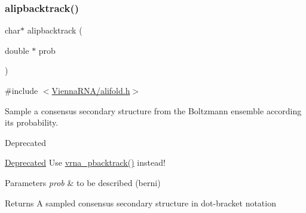 \subsubsection{\texorpdfstring{alipbacktrack()}{alipbacktrack()}}
{\footnotesize\ttfamily char$\ast$ alipbacktrack (\begin{DoxyParamCaption}\item[{double $\ast$}]{prob }\end{DoxyParamCaption})}



{\ttfamily \#include $<$\hyperlink{alifold_8h}{Vienna\+R\+N\+A/alifold.\+h}$>$}



Sample a consensus secondary structure from the Boltzmann ensemble according its probability. 

\begin{DoxyRefDesc}{Deprecated}
\item[\hyperlink{deprecated__deprecated000023}{Deprecated}]Use \hyperlink{group__subopt__stochbt_ga901fe42a33b07be083421741bf7dc610}{vrna\+\_\+pbacktrack()} instead!\end{DoxyRefDesc}



\begin{DoxyParams}{Parameters}
{\em prob} & to be described (berni) \\
\hline
\end{DoxyParams}
\begin{DoxyReturn}{Returns}
A sampled consensus secondary structure in dot-\/bracket notation 
\end{DoxyReturn}
